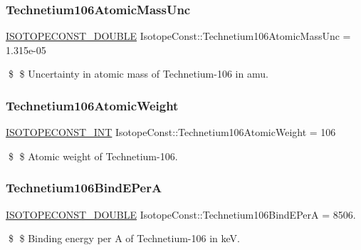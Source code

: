 \subsubsection{\texorpdfstring{Technetium106\+Atomic\+Mass\+Unc}{Technetium106AtomicMassUnc}}
{\footnotesize\ttfamily \mbox{\hyperlink{group___isotope_const-_macros_ga8f45a7272ce02c0b4c65c44636ed719a}{I\+S\+O\+T\+O\+P\+E\+C\+O\+N\+S\+T\+\_\+\+D\+O\+U\+B\+LE}} Isotope\+Const\+::\+Technetium106\+Atomic\+Mass\+Unc = 1.\+315e-\/05}

\$ \$ Uncertainty in atomic mass of Technetium-\/106 in amu. \mbox{\label{group___isotope_const-_technetium-_tc106_ga491f0b03430890bb63e014913d130ab5}} 
\subsubsection{\texorpdfstring{Technetium106\+Atomic\+Weight}{Technetium106AtomicWeight}}
{\footnotesize\ttfamily \mbox{\hyperlink{group___isotope_const-_macros_ga5f18360b3e99483a35c32d789e62621c}{I\+S\+O\+T\+O\+P\+E\+C\+O\+N\+S\+T\+\_\+\+I\+NT}} Isotope\+Const\+::\+Technetium106\+Atomic\+Weight = 106}

\$ \$ Atomic weight of Technetium-\/106. \mbox{\label{group___isotope_const-_technetium-_tc106_ga65ed29bc4ab120a5bd8272e30be0c1cb}} 
\subsubsection{\texorpdfstring{Technetium106\+Bind\+E\+PerA}{Technetium106BindEPerA}}
{\footnotesize\ttfamily \mbox{\hyperlink{group___isotope_const-_macros_ga8f45a7272ce02c0b4c65c44636ed719a}{I\+S\+O\+T\+O\+P\+E\+C\+O\+N\+S\+T\+\_\+\+D\+O\+U\+B\+LE}} Isotope\+Const\+::\+Technetium106\+Bind\+E\+PerA = 8506.}

\$ \$ Binding energy per A of Technetium-\/106 in keV. \mbox{\label{group___isotope_const-_technetium-_tc106_ga856c18b8483749c77d33f93fc500c5e2}} 
